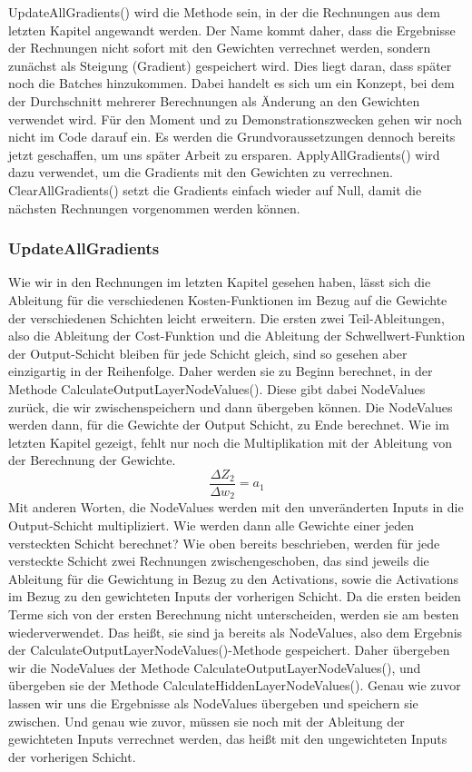 \documentclass[12pt]{article}
\begin{document}
UpdateAllGradients() wird die Methode sein, in der die Rechnungen aus dem letzten Kapitel angewandt werden. Der Name kommt daher, dass die Ergebnisse der Rechnungen nicht sofort mit den Gewichten verrechnet werden, sondern zunächst als Steigung (Gradient) gespeichert wird. Dies liegt daran, dass später noch die Batches hinzukommen. Dabei handelt es sich um ein Konzept, bei dem der Durchschnitt mehrerer Berechnungen  als Änderung an den Gewichten verwendet wird. Für den Moment und zu Demonstrationszwecken gehen wir noch nicht im Code darauf ein. Es werden die Grundvoraussetzungen dennoch bereits jetzt geschaffen, um uns später Arbeit zu ersparen. ApplyAllGradients() wird dazu verwendet, um die Gradients mit den Gewichten zu verrechnen. 
ClearAllGradients() setzt die Gradients einfach wieder auf Null, damit die nächsten Rechnungen vorgenommen werden können.\subsubsection{UpdateAllGradients}Wie wir in den Rechnungen im letzten Kapitel gesehen haben, lässt sich die Ableitung für die verschiedenen Kosten-Funktionen im Bezug auf die Gewichte der verschiedenen Schichten leicht erweitern. Die ersten zwei Teil-Ableitungen, also die Ableitung der Cost-Funktion und die Ableitung der Schwellwert-Funktion der Output-Schicht bleiben für jede Schicht gleich, sind so gesehen aber einzigartig in der Reihenfolge. Daher werden sie zu Beginn berechnet, in der Methode CalculateOutputLayerNodeValues(). Diese gibt dabei NodeValues zurück, die wir zwischenspeichern und dann übergeben können. Die NodeValues werden dann, für die Gewichte der Output Schicht, zu Ende berechnet. Wie im letzten Kapitel gezeigt, fehlt nur noch die Multiplikation mit der Ableitung von der Berechnung der Gewichte. 
$$\frac{\Delta Z_2}{\Delta w_2}=a_1$$
Mit anderen Worten, die NodeValues werden mit den unveränderten Inputs in die Output-Schicht multipliziert. Wie werden dann alle Gewichte einer jeden versteckten Schicht berechnet? 
Wie oben bereits beschrieben, werden für jede versteckte Schicht zwei Rechnungen zwischengeschoben, das sind jeweils die Ableitung für die Gewichtung in Bezug zu den Activations, sowie die Activations im Bezug zu den gewichteten Inputs der vorherigen Schicht. Da die ersten beiden Terme sich von der ersten Berechnung nicht unterscheiden, werden sie am besten wiederverwendet. Das heißt, sie sind ja bereits als NodeValues, also dem Ergebnis der CalculateOutputLayerNodeValues()-Methode gespeichert. Daher übergeben wir die NodeValues der Methode CalculateOutputLayerNodeValues(), und übergeben sie der Methode CalculateHiddenLayerNodeValues(). Genau wie zuvor lassen wir uns die Ergebnisse als NodeValues übergeben und speichern sie zwischen. Und genau wie zuvor, müssen sie noch mit der Ableitung der gewichteten Inputs verrechnet werden, das heißt mit den ungewichteten Inputs der vorherigen Schicht.
\end{document}
